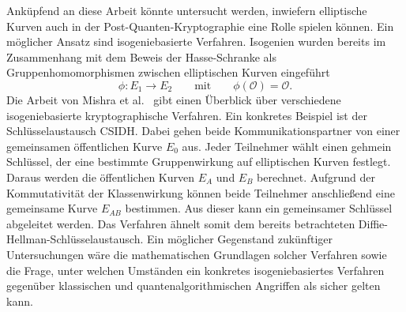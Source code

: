 Anküpfend an diese Arbeit könnte untersucht werden, inwiefern elliptische Kurven auch in der Post-Quanten-Kryptographie eine Rolle spielen können. Ein möglicher Ansatz sind isogeniebasierte Verfahren. Isogenien wurden bereits im Zusammenhang mit dem Beweis der Hasse-Schranke als Gruppenhomomorphismen zwischen elliptischen Kurven eingeführt
\[
        \phi:E_1\to E_2
        \qquad\text{mit}\qquad
        \phi(\mathcal O)=\mathcal O.
\]
Die Arbeit von Mishra et al.~\cite{mishra26} gibt einen Überblick über verschiedene isogeniebasierte kryptographische Verfahren. Ein konkretes Beispiel ist der Schlüsselaustausch CSIDH. Dabei gehen beide Kommunikationspartner von einer gemeinsamen öffentlichen Kurve $E_0$ aus. Jeder Teilnehmer wählt einen gehmein Schlüssel, der eine bestimmte Gruppenwirkung auf elliptischen Kurven festlegt. Daraus werden die öffentlichen Kurven $E_A$ und $E_B$ berechnet. Aufgrund der Kommutativität der Klassenwirkung können beide Teilnehmer anschließend eine gemeinsame Kurve $E_{AB}$ bestimmen. Aus dieser kann ein gemeinsamer Schlüssel abgeleitet werden. Das Verfahren ähnelt somit dem bereits betrachteten Diffie-Hellman-Schlüsselaustausch. Ein möglicher Gegenstand zukünftiger Untersuchungen wäre die mathematischen Grundlagen solcher Verfahren sowie die Frage, unter welchen Umständen ein konkretes isogeniebasiertes Verfahren gegenüber klassischen und quantenalgorithmischen Angriffen als sicher gelten kann.